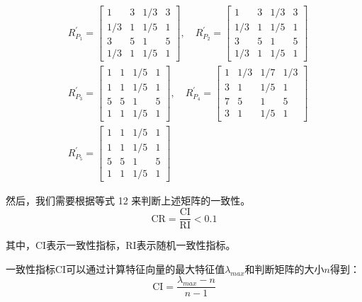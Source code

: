 $$
\begin{aligned}
& R_{P_1}^{\prime}=\left[\begin{array}{cccc}
1 & 3 & 1 / 3 & 3 \\
1 / 3 & 1 & 1 / 5 & 1 \\
3 & 5 & 1 & 5 \\
1 / 3 & 1 & 1 / 5 & 1
\end{array}\right], \quad R_{P_2}^{\prime}=\left[\begin{array}{cccc}
1 & 3 & 1 / 3 & 3 \\
1 / 3 & 1 & 1 / 5 & 1 \\
3 & 5 & 1 & 5 \\
1 / 3 & 1 & 1 / 5 & 1
\end{array}\right] \\
& R_{P_3}^{\prime}=\left[\begin{array}{cccc}
1 & 1 & 1 / 5 & 1 \\
1 & 1 & 1 / 5 & 1 \\
5 & 5 & 1 & 5 \\
1 & 1 & 1 / 5 & 1
\end{array}\right], \quad R_{P_4}^{\prime}=\left[\begin{array}{cccc}
1 & 1 / 3 & 1 / 7 & 1 / 3 \\
3 & 1 & 1 / 5 & 1 \\
7 & 5 & 1 & 5 \\
3 & 1 & 1 / 5 & 1
\end{array}\right] \\
& R_{P_5}^{\prime}=\left[\begin{array}{cccc}
1 & 1 & 1 / 5 & 1 \\
1 & 1 & 1 / 5 & 1 \\
5 & 5 & 1 & 5 \\
1 & 1 & 1 / 5 & 1
\end{array}\right]
\end{aligned}
$$

然后，我们需要根据等式 12 来判断上述矩阵的一致性。
\begin{equation}
\text{CR}=\frac{\text{CI}}{\text{RI}} < 0.1
\end{equation}

其中，$\text{CI}$表示一致性指标，$\text{RI}$表示随机一致性指标。

一致性指标$\text{CI}$可以通过计算特征向量的最大特征值$\lambda_{max}$和判断矩阵的大小$n$得到：
\begin{equation}
\text{CI}=\frac{\lambda_{max}-n}{n-1}
\end{equation}


